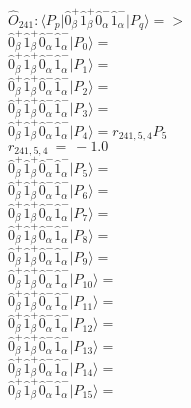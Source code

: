 \documentclass[14pt]{article}
\begin{document}
    $\hat{O}_{241}:  \langle{P_p}\vert \hat{0}_{\beta}^{+}\hat{1}_{\beta}^{+}\hat{0}_{\alpha}^{-}\hat{1}_{\alpha}^{-} \vert{P_q}\rangle => $ \\ 
    $ \hat{0}_{\beta}^{+}\hat{1}_{\beta}^{+}\hat{0}_{\alpha}^{-}\hat{1}_{\alpha}^{-} \vert{P_{0}}\rangle =  $ \\ 
    $ \hat{0}_{\beta}^{+}\hat{1}_{\beta}^{+}\hat{0}_{\alpha}^{-}\hat{1}_{\alpha}^{-} \vert{P_{1}}\rangle =  $ \\ 
    $ \hat{0}_{\beta}^{+}\hat{1}_{\beta}^{+}\hat{0}_{\alpha}^{-}\hat{1}_{\alpha}^{-} \vert{P_{2}}\rangle =  $ \\ 
    $ \hat{0}_{\beta}^{+}\hat{1}_{\beta}^{+}\hat{0}_{\alpha}^{-}\hat{1}_{\alpha}^{-} \vert{P_{3}}\rangle =  $ \\ 
    $ \hat{0}_{\beta}^{+}\hat{1}_{\beta}^{+}\hat{0}_{\alpha}^{-}\hat{1}_{\alpha}^{-} \vert{P_{4}}\rangle = {r}_{241,5,4}P_{5} $ \\ 
    ${r}_{241,5,4}\ =\ -1.0 $ \\ 
    $ \hat{0}_{\beta}^{+}\hat{1}_{\beta}^{+}\hat{0}_{\alpha}^{-}\hat{1}_{\alpha}^{-} \vert{P_{5}}\rangle =  $ \\ 
    $ \hat{0}_{\beta}^{+}\hat{1}_{\beta}^{+}\hat{0}_{\alpha}^{-}\hat{1}_{\alpha}^{-} \vert{P_{6}}\rangle =  $ \\ 
    $ \hat{0}_{\beta}^{+}\hat{1}_{\beta}^{+}\hat{0}_{\alpha}^{-}\hat{1}_{\alpha}^{-} \vert{P_{7}}\rangle =  $ \\ 
    $ \hat{0}_{\beta}^{+}\hat{1}_{\beta}^{+}\hat{0}_{\alpha}^{-}\hat{1}_{\alpha}^{-} \vert{P_{8}}\rangle =  $ \\ 
    $ \hat{0}_{\beta}^{+}\hat{1}_{\beta}^{+}\hat{0}_{\alpha}^{-}\hat{1}_{\alpha}^{-} \vert{P_{9}}\rangle =  $ \\ 
    $ \hat{0}_{\beta}^{+}\hat{1}_{\beta}^{+}\hat{0}_{\alpha}^{-}\hat{1}_{\alpha}^{-} \vert{P_{10}}\rangle =  $ \\ 
    $ \hat{0}_{\beta}^{+}\hat{1}_{\beta}^{+}\hat{0}_{\alpha}^{-}\hat{1}_{\alpha}^{-} \vert{P_{11}}\rangle =  $ \\ 
    $ \hat{0}_{\beta}^{+}\hat{1}_{\beta}^{+}\hat{0}_{\alpha}^{-}\hat{1}_{\alpha}^{-} \vert{P_{12}}\rangle =  $ \\ 
    $ \hat{0}_{\beta}^{+}\hat{1}_{\beta}^{+}\hat{0}_{\alpha}^{-}\hat{1}_{\alpha}^{-} \vert{P_{13}}\rangle =  $ \\ 
    $ \hat{0}_{\beta}^{+}\hat{1}_{\beta}^{+}\hat{0}_{\alpha}^{-}\hat{1}_{\alpha}^{-} \vert{P_{14}}\rangle =  $ \\ 
    $ \hat{0}_{\beta}^{+}\hat{1}_{\beta}^{+}\hat{0}_{\alpha}^{-}\hat{1}_{\alpha}^{-} \vert{P_{15}}\rangle =  $ \\ 
    
\end{document}
